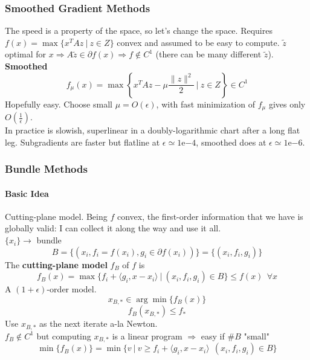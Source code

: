 \documentclass[10pt]{report}
\begin{document}
\subsubsection{Smoothed Gradient Methods} The speed is a property of the space, so let's change the space. Requires $f(x) = \max\{x^TAz\:|\:z\in Z\}$ convex and assumed to be easy to compute. $\tilde{z}$ optimal for $x\Rightarrow A\tilde{z}\in\partial f(x)\Rightarrow f\not\in C^1$ (there can be many different $\tilde{z}$).\\
\textbf{Smoothed} $$f_\mu(x)=\max\left\{x^TAz-\mu\frac{\|z\|^2}{2}\:|\:z\in Z\right\}\in C^1$$ Hopefully easy. Choose small $\mu=O(\epsilon)$, with fast minimization of $f_\mu$ gives only $O(\frac{1}{\epsilon})$.\\
In practice is slowish, superlinear in a doubly-logarithmic chart after a long flat leg. Subgradients are faster but flatline at $\epsilon\simeq 1$e$-4$, smoothed does at $\epsilon\simeq 1$e$-6$.
\subsubsection{Bundle Methods}
\paragraph{Basic Idea} Cutting-plane model. Being $f$ convex, the first-order information that we have is globally valid: I can collect it along the way and use it all.\\
$\{x_i\}\rightarrow$ bundle $$B=\{(x_i, f_i = f(x_i), g_i\in\partial f(x_i))\} = \{(x_i, f_i, g_i)\}$$
The \textbf{cutting-plane model} $f_B$ of $f$ is $$f_B(x) = \max\{f_i+\langle g_i, x-x_i\rangle\:|\:(x_i, f_i, g_i)\in B\}\leq f(x)\:\:\forall x$$ A $(1+\epsilon)$-order model.
$$x_{B,*}\in \arg\min\{f_B(x)\}$$ $$f_B(x_{B,*})\leq f_*$$ Use $x_{B,*}$ as the next iterate a-la Newton.\\
$f_B\not\in C^1$ but computing $x_{B,*}$ is a linear program $\Rightarrow$ easy if $\# B$ "small" $$\min\{f_B(x)\}=\min\{v\:|\:v\geq f_i+\langle g_i, x-x_i\rangle\:\:(x_i, f_i, g_i)\in B\}$$
\end{document}
